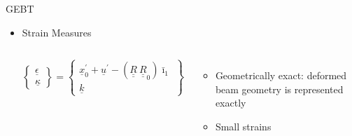 \documentclass[xcolor=cmyk]{beamer}
\newcommand{\tens}[1]{\underline{\underline{#1}}}
\renewcommand{\vec}[1]{\underline{#1}}
\begin{document}
\begin{frame}{GEBT}
\begin{itemize}
    \item Strain Measures
    
    \begin{columns}[c]
    \column{2.0 in}
      \begin{equation*}
      \label{1DStrain}
      \begin{Bmatrix}
          \vec{\epsilon} \\
          \vec{\kappa}
      \end{Bmatrix}
      =
      \begin{Bmatrix}
          \vec{x}^\prime_0 + \vec{u}^\prime - (\tens{R} ~\tens{R}_0) \bar{\imath}_1 \\
          \vec{k} 
      \end{Bmatrix}
      \end{equation*}   
      
      \column{2.0 in}
        \begin{itemize}
        \scriptsize
          \pause
          \item
          Geometrically exact: deformed beam geometry is represented exactly
          \pause
          \item 
          Small strains
        \end{itemize}
      \end{columns}
    \end{itemize}

\end{frame}
\end{document}
